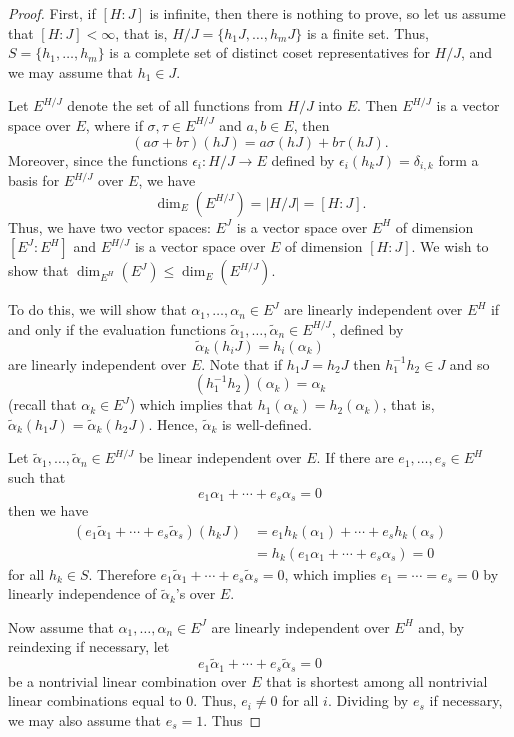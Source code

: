 \begin{proof}
First, if $[H:J]$ is infinite, then there is nothing to prove, so let us
assume that $[H:J]<\infty$, that is, $H/J=\{h_1J,\dots,h_mJ\}$ is a finite set. Thus, $S=\{h_1,\dots,h_m\}$ is a complete set of distinct coset representatives for $H/J$, and we may assume that $h_1\in J$.\par
Let $E^{H/J}$ denote the set of all functions from $H/J$ into $E$. Then $E^{H/J}$ is a vector space over $E$, where if $\sigma,\tau\in E^{H/J}$ and $a,b\in E$, then
\[(a\sigma+b\tau)(hJ)=a\sigma(hJ)+b\tau(hJ).\]
Moreover, since the functions $\epsilon_i:H/J\to E$ defined by $\epsilon_i(h_kJ)=\delta_{i,k}$ form a basis for $E^{H/J}$ over $E$, we have
\[\dim_E(E^{H/J})=|H/J|=[H:J].\]
Thus, we have two vector spaces: $E^J$ is a vector space over $E^H$ of dimension $[E^J:E^H]$ and $E^{H/J}$ is a vector space over $E$ of dimension $[H:J]$. We wish to show that $\dim_{E^H}(E^J)\leq\dim_E(E^{H/J})$.\par
To do this, we will show that $\alpha_1,\dots,\alpha_n\in E^J$ are linearly independent over $E^H$ if and only if the evaluation functions $\widetilde{\alpha}_1,\dots,\widetilde{\alpha}_n\in E^{H/J}$, defined by
\[\widetilde{\alpha}_k(h_iJ)=h_i(\alpha_k)\]
are linearly independent over $E$. Note that if $h_1J=h_2J$ then $h_1^{-1}h_2\in J$ and so
\[(h_1^{-1}h_2)(\alpha_k)=\alpha_k\]
(recall that $\alpha_k\in E^J$) which implies that $h_1(\alpha_k)=h_2(\alpha_k)$, that is, $\widetilde{\alpha}_k(h_1J)=\widetilde{\alpha}_k(h_2J)$. Hence, $\widetilde{\alpha}_k$ is well-defined.\par
Let $\widetilde{\alpha}_1,\dots,\widetilde{\alpha}_n\in E^{H/J}$ be linear independent over $E$. If there are $e_1,\dots,e_s\in E^H$ such that
\[e_1\alpha_1+\cdots+e_s\alpha_s=0\]
then we have
\begin{align*}
(e_1\widetilde{\alpha}_1+\cdots+e_s\widetilde{\alpha}_s)(h_kJ)&=e_1h_k(\alpha_1)+\cdots+e_s h_k(\alpha_s)\\
&=h_k(e_1\alpha_1+\cdots+e_s\alpha_s)=0
\end{align*}
for all $h_k\in S$. Therefore $e_1\widetilde{\alpha}_1+\cdots+e_s\widetilde{\alpha}_s=0$, which implies $e_1=\cdots=e_s=0$ by linearly independence of $\widetilde{\alpha}_k$'s over $E$.\par
Now assume that $\alpha_1,\dots,\alpha_n\in E^J$ are linearly independent over $E^H$ and, by reindexing if necessary, let
\[e_1\widetilde{\alpha}_1+\cdots+e_s\widetilde{\alpha}_s=0\]
be a nontrivial linear combination over $E$ that is shortest among all nontrivial linear combinations equal to $0$. Thus, $e_i\neq 0$ for all $i$. Dividing by $e_s$ if necessary, we may also assume that $e_s=1$. Thus

\end{proof}
